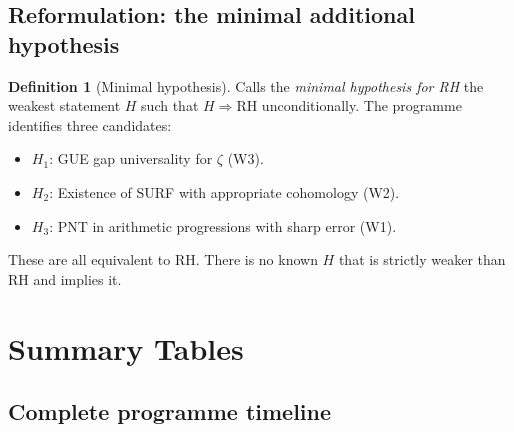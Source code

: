 \documentclass[11pt]{amsart}
\theoremstyle{definition}
\newtheorem{definition}[theorem]{Definition}
\theoremstyle{remark}
\newcommand{\RH}{\mathrm{RH}}
\begin{document}
\subsection{Reformulation: the minimal additional hypothesis}

\begin{definition}[Minimal hypothesis]
Calls the \emph{minimal hypothesis for RH} the weakest statement $H$ such that
$H \Rightarrow \RH$ unconditionally.  The programme identifies three candidates:
\begin{itemize}
  \item $H_1$: GUE gap universality for $\zeta$ (W3).
  \item $H_2$: Existence of SURF with appropriate cohomology (W2).
  \item $H_3$: PNT in arithmetic progressions with sharp error (W1).
\end{itemize}
These are all equivalent to RH.  There is no known $H$ that is strictly weaker
than RH and implies it.
\end{definition}

\section{Summary Tables}
\label{sec:tables}

\subsection{Complete programme timeline}
\end{document}
